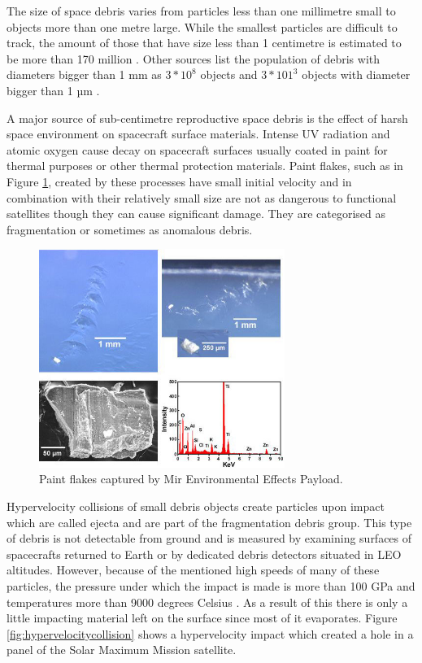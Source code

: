 	The size of space debris varies from particles less than one millimetre small to objects more than one metre large. While the smallest particles are difficult to track, the amount of those that have size less than 1 centimetre is estimated to be more than 170 million \citep{esabr336}. Other sources list the population of debris with diameters bigger than 1 mm as $3*10^8$ objects and $3*101^3$ objects with diameter bigger than 1 µm \citep{klinkrad2006space}. 

	A major source of sub-centimetre reproductive space debris is the effect of harsh space environment on spacecraft surface materials. Intense UV radiation and atomic oxygen cause decay on spacecraft surfaces usually coated in paint for thermal purposes or other thermal protection materials. Paint flakes, such as in Figure \ref{fig:paintflakes}, created by these processes have small initial velocity and in combination with their relatively small size are not as dangerous to functional satellites though they can cause significant damage. They are categorised as fragmentation or sometimes as anomalous debris.
	
\begin{figure}[H]
	\centering
  \includegraphics[width=8cm]{images/paintflakes}
  \caption{Paint flakes captured by Mir Environmental Effects Payload.}
  \label{fig:paintflakes}
\end{figure}
	
	Hypervelocity collisions of small debris objects create particles upon impact which are called ejecta and are part of the fragmentation debris group. This type of debris is not detectable from ground and is measured by examining surfaces of spacecrafts returned to Earth or by dedicated debris detectors situated in LEO altitudes. However, because of the mentioned high speeds of many of these particles, the pressure under which the impact is made is more than 100 GPa and temperatures more than 9000 degrees Celsius \citep{klinkrad2006space}. As a result of this there is only a little impacting material left on the surface since most of it evaporates. Figure \ref{fig:hypervelocitycollision} shows a hypervelocity impact which created a hole in a panel of the Solar Maximum Mission satellite.
	
